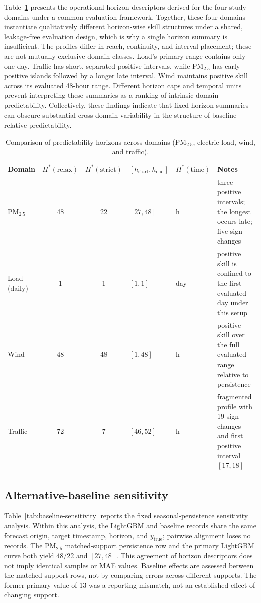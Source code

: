 \documentclass[pdflatex]{sn-jnl}
\begin{document}
Table~\ref{tab:results} presents the operational horizon descriptors
derived for the four study domains under a common evaluation framework.
Together, these four domains instantiate qualitatively different horizon-wise skill structures under a shared, leakage-free evaluation design, which is why a single horizon summary is insufficient.
The profiles differ in reach, continuity, and interval placement; these
are not mutually exclusive domain classes. Load's primary range contains
only one day. Traffic has short, separated positive intervals, while
PM$_{2.5}$ has early positive islands followed by a longer late interval.
Wind maintains positive skill across its evaluated 48-hour range.
Different horizon caps and temporal units prevent interpreting these
summaries as a ranking of intrinsic domain predictability.
Collectively, these findings indicate that fixed-horizon summaries can
obscure substantial cross-domain variability in the structure of
baseline-relative predictability.

\begin{table}[h]
\centering
\small
\setlength{\tabcolsep}{4pt}
\renewcommand{\arraystretch}{1.1}
\begin{tabularx}{\linewidth}{@{}l c c >{\centering\arraybackslash}p{1.8cm} >{\centering\arraybackslash}p{1.4cm} >{\raggedright\arraybackslash}X@{}}
\toprule
Domain & $H^*(\mathrm{relax})$ & $H^*(\mathrm{strict})$ & $[h_{\mathrm{start}}, h_{\mathrm{end}}]$ & $H^*(\mathrm{time})$ & Notes \\
\midrule
PM$_{2.5}$ & 48 & 22 & $[27,48]$ & 22 h & three positive intervals; the longest occurs late; five sign changes \\
Load (daily) & 1 & 1 & $[1,1]$ & 1 day & positive skill is confined to the first evaluated day under this setup \\
Wind & 48 & 48 & $[1,48]$ & 48 h & positive skill over the full evaluated range relative to persistence \\
Traffic & 72 & 7 & $[46,52]$ & 7 h & fragmented profile with 19 sign changes and first positive interval $[17,18]$ \\
\bottomrule
\end{tabularx}
\caption{Comparison of predictability horizons across domains (PM$_{2.5}$, electric load, wind, and traffic).}
\label{tab:results}
\end{table}

\subsection{Alternative-baseline sensitivity}
Table~\ref{tab:baseline-sensitivity} reports the fixed seasonal-persistence
sensitivity analysis. Within this analysis,
the LightGBM and baseline records share the same forecast origin, target
timestamp, horizon, and $y_{\mathrm{true}}$; pairwise alignment loses no
records. The PM$_{2.5}$ matched-support persistence row and the primary
LightGBM curve both yield 48/22 and $[27,48]$. This agreement of horizon
descriptors does not imply identical samples or MAE values. Baseline
effects are assessed between the matched-support rows, not by comparing
errors across different supports. The former primary value of 13 was a
reporting mismatch, not an established effect of changing support.
\end{document}
